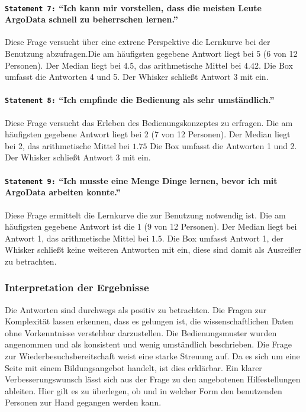 \paragraph{\texttt{Statement 7:} "`Ich kann mir vorstellen, dass die meisten Leute ArgoData schnell zu beherrschen lernen."'}
    Diese Frage versucht über eine extrene Perspektive die Lernkurve bei der Benutzung abzufragen.Die am häufigsten gegebene Antwort liegt bei 5 (6 von 12 Personen). Der Median liegt bei 4.5, das arithmetische Mittel bei $4.42$. Die Box umfasst die Antworten 4 und 5. Der Whisker schließt Antwort 3 mit ein.

\paragraph{\texttt{Statement 8:} "`Ich empfinde die Bedienung als sehr umständlich."'}
    Diese Frage versucht das Erleben des Bedienungskonzeptes zu erfragen. Die am häufigsten gegebene Antwort liegt bei 2 (7 von 12 Personen). Der Median liegt bei 2, das arithmetische Mittel bei $1.75$ Die Box umfasst die Antworten 1 und 2. Der Whisker schließt Antwort 3 mit ein.

\paragraph{\texttt{Statement 9:} "`Ich musste eine Menge Dinge lernen, bevor ich mit ArgoData arbeiten konnte."'}
    Diese Frage ermittelt die Lernkurve die zur Benutzung notwendig ist. Die am häufigsten gegebene Antwort ist die 1 (9 von 12 Personen). Der Median liegt bei Antwort 1, das arithmetische Mittel bei $1.5$. Die Box umfasst Antwort 1, der Whisker schließt keine weiteren Antworten mit ein, diese sind damit als Ausreißer zu betrachten.

\subsubsection{Interpretation der Ergebnisse}
Die Antworten sind durchwegs als positiv zu betrachten. Die Fragen zur Komplexität lassen erkennen, dass es gelungen ist, die wissenschaftlichen Daten ohne Vorkenntnisse verstehbar darzustellen. Die Bedienungsmuster wurden angenommen und als konsistent und wenig umständlich beschrieben. Die Frage zur Wiederbesuchsbereitschaft weist eine starke Streuung auf. Da es sich um eine Seite mit einem Bildungsangebot handelt, ist dies erklärbar.
Ein klarer Verbesserungswunsch lässt sich aus der Frage zu den angebotenen Hilfestellungen ableiten. Hier gilt es  zu überlegen, ob und in welcher Form den benutzenden Personen zur Hand gegangen werden kann.



